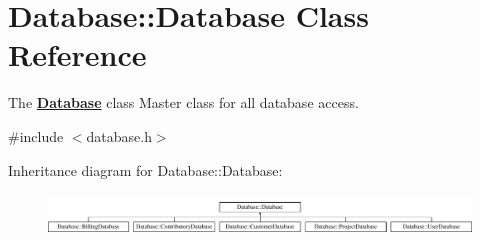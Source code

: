 \hypertarget{classDatabase_1_1Database}{\section{Database\+:\+:Database Class Reference}
\label{classDatabase_1_1Database}
}


The {\bfseries \hyperlink{classDatabase_1_1Database}{Database}} class Master class for all database access.  




{\ttfamily \#include $<$database.\+h$>$}

Inheritance diagram for Database\+:\+:Database\+:\begin{figure}[H]
\begin{center}
\leavevmode
\includegraphics[height=1.108911cm]{da/d8e/classDatabase_1_1Database}
\end{center}
\end{figure}
